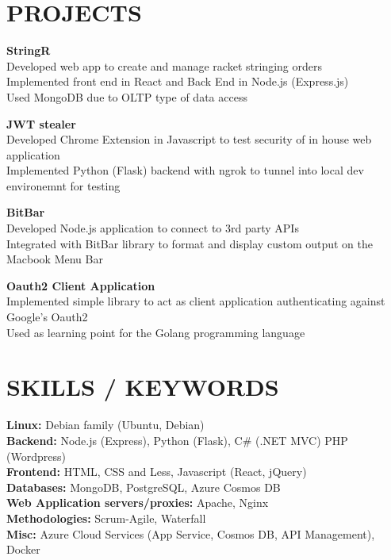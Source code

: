 \documentclass[margin,line]{resume}
\begin{document}
\begin{resume}
\sectionline


\section{\mysidestyle \textbf{\large{P}\small{ROJECTS}}}

    \textbf{\listing StringR} \vspace{2mm}\\\vspace{1mm}%
    Developed web app to create and manage racket stringing orders\\
    Implemented front end in React and Back End in Node.js (Express.js)\\
    Used MongoDB due to OLTP type of data access
    

    \textbf{\listing JWT stealer} \vspace{2mm}\\\vspace{1mm}%
    Developed Chrome Extension in Javascript to test security of in house web application\\
    Implemented Python (Flask) backend with ngrok to tunnel into local dev environemnt for testing

    \textbf{\listing BitBar} \vspace{2mm}\\\vspace{1mm}%
    Developed Node.js application to connect to 3rd party APIs\\
    Integrated with BitBar library to format and display custom output on the Macbook Menu Bar

    \textbf{\listing Oauth2 Client Application} \vspace{2mm}\\\vspace{1mm}%
    Implemented simple library to act as client application authenticating against Google's Oauth2\\
    Used as learning point for the Golang programming language


\sectionline
    \section{\mysidestyle \textbf{\large{S}\small{KILLS} / \large{K}\small{EYWORDS}}}

    \textbf{Linux:} Debian family (Ubuntu, Debian)\\
    \textbf{Backend:} Node.js (Express), Python (Flask), C\# (.NET MVC) PHP (Wordpress)\\
    \textbf{Frontend:} HTML, CSS and Less, Javascript (React, jQuery)\\
    \textbf{Databases:} MongoDB, PostgreSQL, Azure Cosmos DB\\
    \textbf{Web Application servers/proxies:} Apache, Nginx\\
    \textbf{Methodologies:} Scrum-Agile, Waterfall\\
    \textbf{Misc:} Azure Cloud Services (App Service, Cosmos DB, API Management), Docker


\end{resume}
\end{document}
